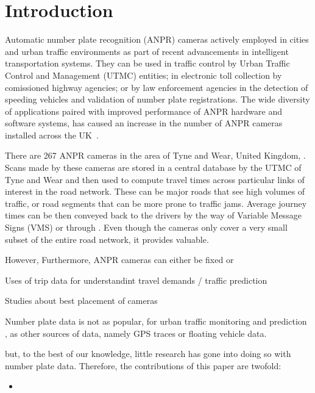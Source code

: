 \section{Introduction}


Automatic number plate recognition (ANPR) cameras actively employed in cities and urban traffic environments as part of recent advancements in intelligent transportation systems. They can be used in traffic control by Urban Traffic Control and Management (UTMC) entities; in electronic toll collection by comissioned highway agencies; or by law enforcement agencies in the detection of speeding vehicles and validation of number plate registrations. The wide diversity of applications paired with improved performance of ANPR hardware and software systems, has caused an increase in the number of ANPR cameras installed across the UK~\cite{EvolutionUTMC2013}.

There are 267 ANPR cameras in the area of Tyne and Wear, United Kingdom, . Scans made by these cameras are stored in a central database by the UTMC of Tyne and Wear and then used to compute travel times across particular links of interest in the road network. These can be major roads that see high volumes of traffic, or road segments that can be more prone to traffic jams. Average journey times can be then conveyed back to the drivers by the way of Variable Message Signs (VMS) or through . Even though the cameras only cover a very small subset of the entire road network, it provides valuable.

However, Furthermore, ANPR cameras can either be fixed or

Uses of trip data for understandint travel demands / traffic prediction

Studies about best placement of cameras

Number plate data is not as popular, for urban traffic monitoring and prediction , as other sources of data, namely GPS traces or floating vehicle data.

but, to the best of our knowledge, little research has gone into doing so with number plate data. Therefore, the contributions of this paper are twofold:

\begin{itemize}
  \item
\end{itemize}


